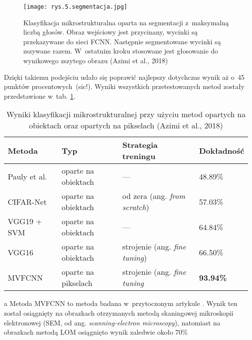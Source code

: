 \begin{figure}[h]
    \centering
    \texttt{[image: rys.5.segmentacja.jpg]}
    \caption{Klasyfikacja mikrostrukturalna oparta na segmentacji z~maksymalną liczbą głosów. Obraz wejściowy jest przycinany, wycinki są przekazywane do sieci FCNN. Następnie segmentowane wycinki są zszywane razem. W~ostatnim kroku stosowane jest głosowanie do wynikowego zszytego obrazu (Azimi et al., 2018)}
    \label{fig:mesh5}
\end{figure}
Dzięki takiemu podejściu udało się poprawić najlepszy dotychczas wynik aż o~45 punktów procentowych~(sic!). Wyniki wszystkich przetestowanych metod zostały przedstawione w~tab. \ref{tab:tab1}.

\begin{table}[h]
	\centering
	\begin{threeparttable}
		\caption{Wyniki klasyfikacji mikrostrukturalnej przy użyciu metod opartych na obiektach oraz opartych na pikselach (Azimi et al., 2018)}
		\label{tab:tab1}
		\begin{tabularx}{1\textwidth}{ |X|X|X|X| }
  \hline
   \textbf{Metoda} & \textbf{Typ} & \textbf{Strategia treningu} & \textbf{Dokładność}\\
  \hline
  Pauly et al. \cite{Pauly16} & oparte na obiektach & — & 48.89\%\\
  \hline
  CIFAR-Net & oparte na obiektach & od zera (ang. \textit{from scratch}) & 57.03\%\\
  \hline
  VGG19 + SVM & oparte na obiektach & — & 64.84\%\\
  \hline
  VGG16 & oparte na obiektach & strojenie (ang. \textit{fine tuning}) & 66.50\%\\
  \hline
  MVFCNN\tnote{a} & oparte na pikselach & strojenie (ang. \textit{fine tuning} & \textbf{93.94\%}\\
  \hline
\end{tabularx}
		\begin{tablenotes}
			\footnotesize
			\item[a] Metoda MVFCNN to metoda badana w~przytoczonym artykule \cite{Azimi18}. Wynik ten został osiągnięty na obrazkach otrzymanych metodą skaningowej mikroskopii elektronowej (SEM, od ang. \textit{scanning-electron microscopy}), natomiast na obrazkach metodą LOM osiągnięto wynik zaledwie około 70\%\textellipsis
		\end{tablenotes}
	\end{threeparttable}
\end{table}

